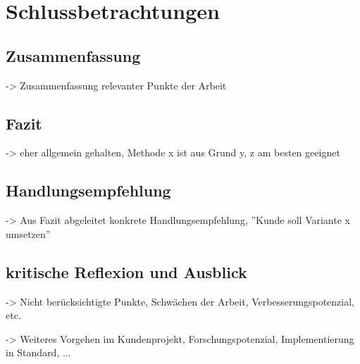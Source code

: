 \chapter{Schlussbetrachtungen}

\section{Zusammenfassung}

-> Zusammenfassung relevanter Punkte der Arbeit

\section{Fazit}

-> eher allgemein gehalten, Methode x ist aus Grund y, z am besten geeignet

\section{Handlungsempfehlung}

-> Aus Fazit abgeleitet konkrete Handlungsempfehlung, ''Kunde soll Variante x umsetzen''

\section{kritische Reflexion und Ausblick}

-> Nicht berücksichtigte Punkte, Schwächen der Arbeit, Verbesserungspotenzial, etc.

-> Weiteres Vorgehen im Kundenprojekt, Forschungspotenzial, Implementierung in Standard, ...